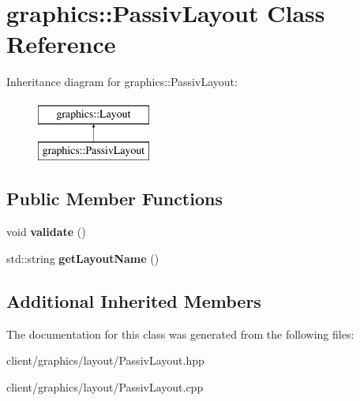 \hypertarget{classgraphics_1_1_passiv_layout}{\section{graphics\-:\-:Passiv\-Layout Class Reference}
\label{classgraphics_1_1_passiv_layout}
}
Inheritance diagram for graphics\-:\-:Passiv\-Layout\-:\begin{figure}[H]
\begin{center}
\leavevmode
\includegraphics[height=2.000000cm]{classgraphics_1_1_passiv_layout}
\end{center}
\end{figure}
\subsection*{Public Member Functions}
\begin{DoxyCompactItemize}
\item 
\hypertarget{classgraphics_1_1_passiv_layout_a1afb2decb620af4696ce6b33aee17445}{void {\bfseries validate} ()}\label{classgraphics_1_1_passiv_layout_a1afb2decb620af4696ce6b33aee17445}

\item 
\hypertarget{classgraphics_1_1_passiv_layout_aacf8e7b36f91d5df7c3df885aee5361e}{std\-::string {\bfseries get\-Layout\-Name} ()}\label{classgraphics_1_1_passiv_layout_aacf8e7b36f91d5df7c3df885aee5361e}

\end{DoxyCompactItemize}
\subsection*{Additional Inherited Members}


The documentation for this class was generated from the following files\-:\begin{DoxyCompactItemize}
\item 
client/graphics/layout/Passiv\-Layout.\-hpp\item 
client/graphics/layout/Passiv\-Layout.\-cpp\end{DoxyCompactItemize}
